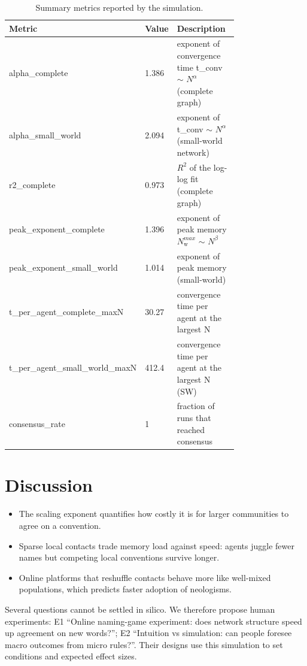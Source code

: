 \documentclass[11pt,a4paper]{article}
\begin{document}
\begin{table}[ht]
\centering\small
\caption{Summary metrics reported by the simulation.}\label{tab:metrics}
\begin{tabular}{p{0.3\linewidth} l p{0.46\linewidth}}
\toprule
Metric & Value & Description\\
\midrule
alpha\_\allowbreak{}complete & 1.386 & exponent of convergence time t\_conv $\sim$ $N^{\alpha}$ (complete graph)\\
alpha\_\allowbreak{}small\_\allowbreak{}world & 2.094 & exponent of t\_conv $\sim$ $N^{\alpha}$ (small-world network)\\
r2\_\allowbreak{}complete & 0.973 & $R^{2}$ of the log-log fit (complete graph)\\
peak\_\allowbreak{}exponent\_\allowbreak{}complete & 1.396 & exponent of peak memory $N_{\mathrm{w}}^{max}$ $\sim$ $N^{\beta}$\\
peak\_\allowbreak{}exponent\_\allowbreak{}small\_\allowbreak{}world & 1.014 & exponent of peak memory (small-world)\\
t\_\allowbreak{}per\_\allowbreak{}agent\_\allowbreak{}complete\_\allowbreak{}maxN & 30.27 & convergence time per agent at the largest N\\
t\_\allowbreak{}per\_\allowbreak{}agent\_\allowbreak{}small\_\allowbreak{}world\_\allowbreak{}maxN & 412.4 & convergence time per agent at the largest N (SW)\\
consensus\_\allowbreak{}rate & 1 & fraction of runs that reached consensus\\
\bottomrule
\end{tabular}
\end{table}
\section{Discussion}
\begin{itemize}
  \item The scaling exponent quantifies how costly it is for larger communities to agree on a convention.
  \item Sparse local contacts trade memory load against speed: agents juggle fewer names but competing local conventions survive longer.
  \item Online platforms that reshuffle contacts behave more like well-mixed populations, which predicts faster adoption of neologisms.
\end{itemize}

Several questions cannot be settled in silico. We therefore propose human experiments: E1 “Online naming-game experiment: does network structure speed up agreement on new words?”; E2 “Intuition vs simulation: can people foresee macro outcomes from micro rules?”. Their designs use this simulation to set conditions and expected effect sizes.
\end{document}
